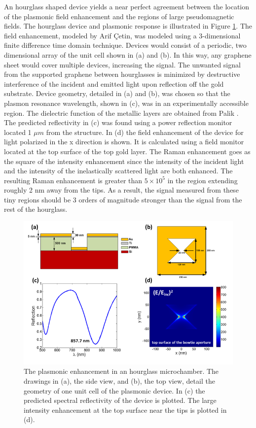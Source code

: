 An hourglass shaped device yields a near perfect agreement between the location of the plasmonic field enhancement and the regions of large pseudomagnetic fields.
The hourglass device and plasmonic response is illustrated in Figure \ref{fig:PVP:hourglass_Plas}.
The field enhancement, modeled by Arif \c{C}etin, was modeled using a 3-dimensional finite difference time domain technique.
Devices would consist of a periodic, two dimensional array of the unit cell shown in (a) and (b).
In this way, any graphene sheet would cover multiple devices, increasing the signal.
The unwanted signal from the supported graphene between hourglasses is minimized by destructive interference of the incident and emitted light upon reflection off the gold substrate.
Device geometry, detailed in (a) and (b), was chosen so that the plasmon resonance wavelength, shown in (c), was in an experimentally accessible region.
The dielectric function of the metallic layers are obtained from Palik \cite{Palik1985}.
The predicted reflectivity in (c) was found using a power reflection monitor located 1 $\mu m$ from the structure.
In (d) the field enhancement of the device for light polarized in the x direction is shown.
It is calculated using a field monitor located at the top surface of the top gold layer.
The Raman enhancement goes as the square of the intensity enhancement since the intensity of the incident light and the intensity of the inelastically scattered light are both enhanced.
The resulting Raman enhancement is greater than $5 \times 10^5$ in the region extending roughly 2 nm away from the tips.
As a result, the signal measured from these tiny regions should be 3 orders of magnitude stronger than the signal from the rest of the hourglass.

\begin{figure}
  \begin{center}
  \includegraphics[scale=.75]{Figs_PVP/HourGlass_Plasmonics.png}
  \end{center}
  \caption[Plasmonic enhancement in hourglass microchambers]{\label{fig:PVP:hourglass_Plas}
  The plasmonic enhancement in an hourglass microchamber.
  The drawings in (a), the side view, and (b), the top view, detail the geometry of one unit cell of the plasmonic device.
  In (c) the predicted spectral reflectivity of the device is plotted.
  The large intensity enhancement at the top surface near the tips is plotted in (d).}
\end{figure}

